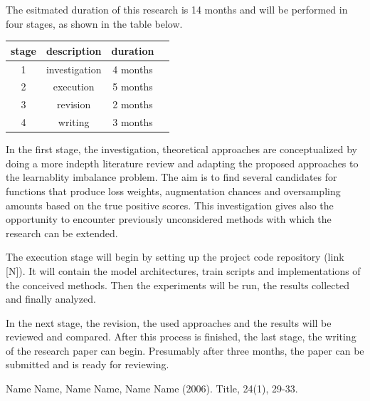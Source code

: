 \documentclass[journal]{IEEEtran}
\begin{document}
The esitmated duration of this research is 14 months and will be performed in four stages, as shown in the table below.

\begin{center}

        \begin{tabular}{ |c|c|c|c| } 
                \hline
                stage & description & duration \\
                \hline
                1 & investigation & 4 months \\ 
                2 & execution & 5 months \\ 
                3 & revision & 2 months \\ 
                4 & writing & 3 months \\
                \hline

        \end{tabular}
\end{center}
        
In the first stage, the investigation, theoretical approaches are conceptualized by doing a more indepth literature review and adapting the proposed approaches to the learnablity imbalance problem. 
The aim is to find several candidates for functions that produce loss weights, augmentation chances and oversampling amounts based on the true positive scores.
This investigation gives also the opportunity to encounter previously unconsidered methods with which the research can be extended.

The execution stage will begin by setting up the project code repository (link [N]). 
It will contain the model architectures, train scripts and implementations of the conceived methods.
Then the experiments will be run, the results collected and finally analyzed. 

In the next stage, the revision, the used approaches and the results will be reviewed and compared. 
After this process is finished, the last stage, the writing of the research paper can begin. 
Presumably after three months, the paper can be submitted and is ready for reviewing.  


\begin{thebibliography}{1}

\bibitem{}
Name Name, Name Name, Name Name (2006). Title, 24(1), 29-33.

\end{thebibliography}
\end{document}
